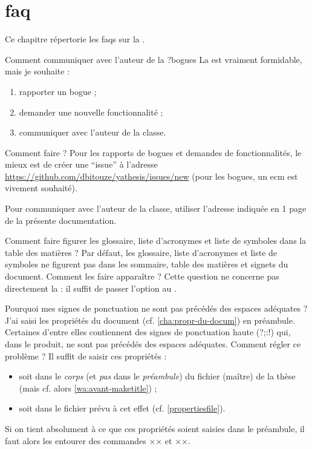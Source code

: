\chapter{\texorpdfstring{\acrshort{faq}}{FAQ}}\label{cha:faq}

Ce chapitre répertorie les \glspl{faq} sur la \yatcl{}.

\begin{dbfaq}{Comment communiquer avec l'auteur de la \yatcl{} ?}{bogues}
  La \yatcl{} est vraiment formidable, mais je souhaite :
  \begin{enumerate}
  \item rapporter un bogue ;
  \item demander une nouvelle fonctionnalité ;
  \item communiquer avec l'auteur de la classe.
  \end{enumerate}
  Comment faire ?
  \tcblower
  Pour les rapports de bogues et demandes de fonctionnalités, le mieux est de
  créer une \enquote{issue} à l'adresse
  \url{https://github.com/dbitouze/yathesis/issues/new} (pour les bogues, un
  \gls{ecm} est vivement souhaité).

  Pour communiquer avec l'auteur de la classe, utiliser l'adresse indiquée en
  1\iere{} page de la présente documentation.
\end{dbfaq}

\begin{dbfaq}{Comment faire figurer les glossaire, liste d'acronymes et liste
    de symboles dans la table des matières ?}{}
  Par défaut, les glossaire, liste d'acronymes et liste de symboles ne figurent
  pas dans les sommaire, table des matières et signets du document. Comment les
  faire apparaître ?
  \tcblower
  Cette question ne concerne pas directement la \yatcl{} : il suffit de passer
  l'option  au .
\end{dbfaq}

\begin{dbfaq}{Pourquoi mes signes de ponctuation ne sont pas précédés
    des espaces adéquates ?}{}
  J'ai saisi les propriétés du document (cf. \vref{cha:propr-du-docum}) en
  préambule. Certaines d'entre elles contiennent des signes de ponctuation
  haute ({\NoAutoSpacing?;:!}) qui, dans le \pdf produit, ne sont pas précédés
  des espaces adéquates. Comment régler ce problème ?
  \tcblower
  Il suffit de saisir ces propriétés :
  \begin{itemize}
  \item soit dans le \emph{corps} (et \emph{pas} dans le \emph{préambule}) du
    fichier (maître) de la thèse (mais cf. alors \vref{wa:avant-maketitle}) ;
  \item soit dans le fichier \file{\propertiesfile} prévu à cet effet
    (cf. \vref{propertiesfile}).
  \end{itemize}
  Si on tient absolument à ce que ces propriétés soient saisies dans le
  préambule, il faut alors les entourer des commandes ×× et
  ××.
\end{dbfaq}

